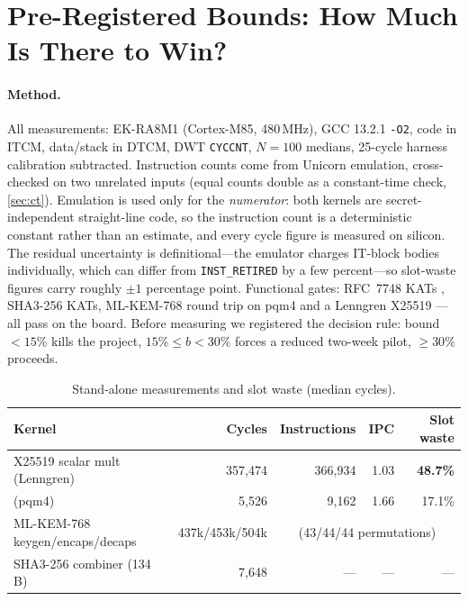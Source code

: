 \documentclass[11pt,a4paper]{article}
\begin{document}
\section{Pre-Registered Bounds: How Much Is There to Win?}\label{sec:bounds}

\paragraph{Method.} All measurements: EK-RA8M1 (Cortex-M85, 480\,MHz), GCC
13.2.1 \texttt{-O2}, code in ITCM, data/stack in DTCM, DWT \texttt{CYCCNT},
$N{=}100$ medians, 25-cycle harness calibration subtracted. Instruction counts
come from Unicorn emulation, cross-checked on two unrelated inputs (equal counts
double as a constant-time check, \cref{sec:ct}). Emulation is used only for the
\emph{numerator}: both kernels are secret-independent straight-line code, so the
instruction count is a deterministic constant rather than an estimate, and every
cycle figure is measured on silicon. The residual uncertainty is definitional---the
emulator charges IT-block bodies individually, which can differ from
\texttt{INST\_RETIRED} by a few percent---so slot-waste figures carry roughly
$\pm1$ percentage point. Functional gates: RFC~7748
KATs \cite{RFC7748}, SHA3-256 KATs, ML-KEM-768 round trip \cite{FIPS203} on
pqm4 \cite{pqm4} and a Lenngren X25519 \cite{Lenngren}---all pass on the board.
Before measuring we registered the decision rule: bound ${<}15\%$ kills the
project, $15\%\leq b<30\%$ forces a reduced two-week pilot, ${\geq}30\%$ proceeds.

\begin{table}[t]\centering
\caption{Stand-alone measurements and slot waste (median cycles).}
\label{tab:base}
\begin{tabular}{lrrrr}\toprule
Kernel & Cycles & Instructions & IPC & Slot waste\\\midrule
X25519 scalar mult (Lenngren) & 357,474 & 366,934 & 1.03 & \textbf{48.7\%}\\
\keccak{} (pqm4) & 5,526 & 9,162 & 1.66 & 17.1\%\\
ML-KEM-768 keygen/encaps/decaps & 437k/453k/504k & \multicolumn{3}{c}{(43/44/44 permutations)}\\
SHA3-256 combiner (134\,B) & 7,648 & --- & --- & ---\\\bottomrule
\end{tabular}\end{table}
\end{document}
